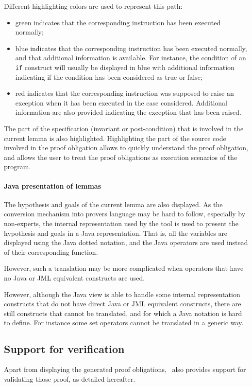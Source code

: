 Different highlighting colors are used to represent this path:
\begin{itemize}
\item green indicates that the corresponding instruction has been
   executed normally;
\item blue indicates that the corresponding instruction has been
   executed normally, and that additional information is
   available. For instance, the condition of an \texttt{if} construct will
   usually be displayed in blue with additional information indicating
   if the condition has been considered as true or false;
\item red indicates that the corresponding instruction was supposed to
   raise an exception when it has been executed in the case
   considered.  Additional information are also provided indicating
   the exception that has been raised.
\end{itemize}
The part of the specification (invariant or post-condition) that is
involved in the current lemma is also highlighted.  Highlighting the
part of the source code involved in the proof obligation allows to
quickly understand the proof obligation, and allows the user to treat
the proof obligations as execution scenarios of the program.
\paragraph{Java presentation of lemmas}
The hypothesis and goals of the current lemma are also displayed. As
the conversion mechanism into provers language may be hard to follow, especially by
non-experts, the internal representation used by the tool is used to
present the hypothesis and goals in a Java representation. That is,
all the variables are displayed using the Java dotted notation, and
the Java operators are used instead of their corresponding function.

However, such a translation may be more complicated when operators that
have no Java or JML equivalent constructs are used.  


 However, although the Java view is able to handle some internal
 representation constructs that do not have direct Java or JML
 equivalent constructs, there are still constructs that cannot be
 translated, and for which a Java notation is hard to define. For
 instance some set operators cannot be translated in a generic way.

\subsection{Support for verification}
Apart from displaying the generated proof obligations, \JACK\ also
provides support for validating those proof, as detailed hereafter.
